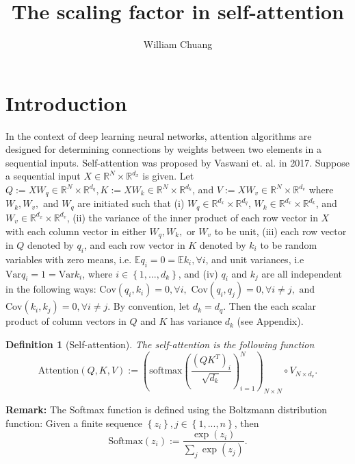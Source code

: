 \documentclass{article}
\theoremstyle{plain}
\theoremstyle{plain} %
\newtheorem{definition}[theorem]{Definition}
\theoremstyle{definition}  %
\theoremstyle{remark}  %
\theoremstyle{plain}
\begin{document}
\title{The scaling factor in self-attention}

\author{William Chuang}

\maketitle


\section{Introduction}
In the context of deep learning neural networks, attention algorithms are designed for determining connections by weights between two elements in a sequential inputs. Self-attention was proposed by Vaswani et. al.\cite{vaswani2017attention} in 2017. Suppose a sequential input $X\in \mathbb{R}^N\times \mathbb{R}^{d_x}$ is given. Let $Q:=XW_q\in \mathbb{R}^{N}\times\mathbb{R}^{d_q}, K:=XW_k\in \mathbb{R}^{N}\times\mathbb{R}^{d_k}$, and $V:=XW_v\in \mathbb{R}^{N}\times\mathbb{R}^{d_v}$ where $W_k, W_v,$ and $W_q$ are initiated such that (i) $W_q\in\mathbb{R}^{d_x}\times\mathbb{R}^{d_q}$, $W_k\in\mathbb{R}^{d_x}\times\mathbb{R}^{d_k}$, and $W_v\in\mathbb{R}^{d_x} \times \mathbb{R}^{d_v}$, (ii) the variance of the inner product of each row vector in $X$ with each column vector in either $W_q, W_k,$ or $W_v$ to be unit, (iii) each row vector in $Q$ denoted by $q_i$, and each row vector in $K$ denoted by $k_i$ to be random variables with zero means, i.e. $\mathbb{E} q_i=0=\mathbb{E} k_i, \forall i$, and unit variances, i.e $\text{Var} q_i=1=\text{Var}k_i$, where $i\in\left\lbrace 1,...,d_k\right\rbrace$, and (iv) $q_i$ and $k_j$ are all independent in the following ways: $\text{Cov}\left( q_i,k_i\right)=0, \forall i,$ $\text{Cov}\left( q_i,q_j\right)=0, \forall i\neq j, \text{ and}$ $\text{Cov}\left( k_i,k_j\right)=0, \forall i\neq j.$ By convention, let $d_k=d_q$. Then the each scalar product of column vectors in $Q$ and $K$ has variance $d_k$ (see Appendix).
 
\begin{definition}[Self-attention]
The self-attention is the following function
$$
\text{Attention}\left(Q,K,V\right):= \left( \text{softmax}\left(\frac{\left( QK^T \right)_i}{\sqrt{d_k}} \right)_{i=1}^N \right)_{N \times N} \circ V_{N \times d_v}.
$$

\end{definition}
\noindent\textbf{Remark:} The Softmax function is defined using the Boltzmann distribution function: Given a finite sequence $\left\lbrace z_i\right\rbrace, j\in\left\lbrace 1,...,n\right\rbrace$, then 
$$
\text{Softmax}(z_i) := \frac{\exp\left(z_i \right) }{\sum\limits_j \exp\left(z_j \right)}.
$$
\end{document}
